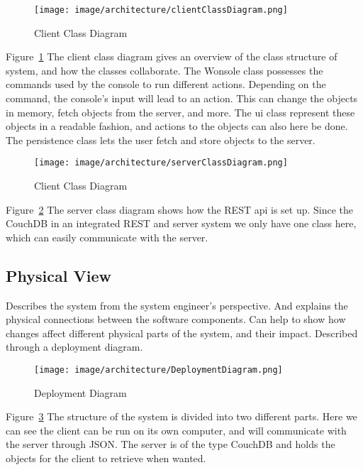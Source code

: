 \begin{figure}[h]
\centering
\texttt{[image: image/architecture/clientClassDiagram.png]}
\caption{Client Class Diagram}
\label{figure:clientClassDiagram}
\end{figure}

Figure~\ref{figure:clientClassDiagram} The client class diagram gives an overview of the class structure of system, and how the classes collaborate. The Wonsole class possesses the commands used by the console to run different actions. Depending on the command, the console's input will lead to an action. This can change the objects in memory, fetch objects from the server, and more. The ui class represent these objects in a readable fashion, and actions to the objects can also here be done. The persistence class lets the user fetch and store objects to the server.

\begin{figure}[h]
\centering
\texttt{[image: image/architecture/serverClassDiagram.png]}
\caption{Client Class Diagram}
\label{figure:serverClassDiagram}
\end{figure}

Figure~\ref{figure:serverClassDiagram} The server class diagram shows how the REST api is set up. Since the CouchDB in an integrated REST and server system we only have one class here, which can easily communicate with the server.

\subsection{Physical View}
Describes the system from the system engineer's perspective. And explains the physical connections between the software components. Can help to show how changes affect different physical parts of the system, and their impact. Described through a deployment diagram.

\begin{figure}[h]
\centering
\texttt{[image: image/architecture/DeploymentDiagram.png]}
\caption{Deployment Diagram}
\label{figure:DeploymentDiagram}
\end{figure}

Figure~\ref{figure:DeploymentDiagram} The structure of the system is divided into two different parts. Here we can see the client can be run on its own computer, and will communicate with the server through JSON. The server is of the type CouchDB and holds the objects for the client to retrieve when wanted.


